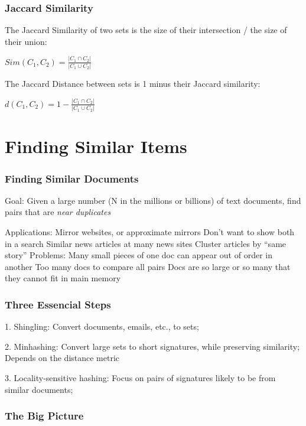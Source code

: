 \documentclass[svgnames]{beamer}
\begin{document}
\begin{frame} \frametitle{Jaccard Similarity}

The Jaccard Similarity of two sets is the size of their intersection / the size of their union:

$Sim(C_1, C_2) = \frac{|C_1 \cap C_2|}{|C_1 \cup C_2|}$

The Jaccard Distance between sets is 1 minus their Jaccard similarity:

$d(C_1, C_2) = 1 - \frac{|C_1 \cap C_2|}{|C_1 \cup C_2|}$



\end{frame}

  
\section{Finding Similar Items}

  
\begin{frame} \frametitle{Finding Similar Documents}

Goal: Given a large number (N in the millions or billions) of text documents, find pairs that are \emph{near duplicates}

Applications:
  Mirror websites, or approximate mirrors
    Don’t want to show both in a search
  Similar news articles at many news sites
    Cluster articles by “same story”
Problems:
  Many small pieces of one doc can appear out of order in another
  Too many docs to compare all pairs
  Docs are so large or so many that they cannot fit in main memory

\end{frame}

  
\begin{frame} \frametitle{Three Essencial Steps}

1. Shingling: Convert documents, emails, etc., to sets;

2. Minhashing: Convert large sets to short signatures, while preserving similarity;
   Depends on the distance metric

3. Locality-sensitive hashing: Focus on pairs of signatures likely to be from similar documents;

\end{frame}

  
\begin{frame} \frametitle{The Big Picture}


\end{frame}
\end{document}
